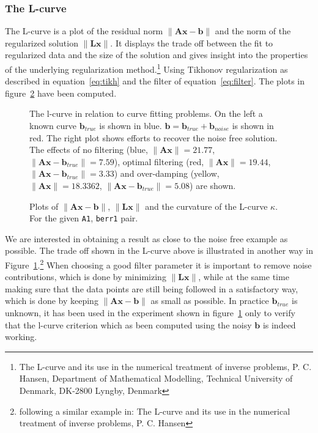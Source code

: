 \subsubsection{The L-curve}
The L-curve is a plot of the residual norm $\|\mathbf{Ax} - \mathbf{b}\|$ and the norm of the regularized solution $\|\mathbf{Lx}\|$. It displays the trade off between the fit to regularized data and the size of the solution and gives insight into the properties of the underlying regularization method.\footnote{The L-curve and its use in the numerical treatment of inverse problems, P. C. Hansen, Department of Mathematical Modelling, Technical University of Denmark, DK-2800 Lyngby, Denmark} Using Tikhonov regularization as described in equation~\ref{eq:tikh} and the filter of equation~\ref{eq:filter}. The plots in figure~\ref{fig:A1LTihk} have been computed. 
\begin{figure}
\centering

\caption{The l-curve in relation to curve fitting problems. On the left a known curve $\mathbf{b}_{true}$ is shown in blue. $\mathbf{b} = \mathbf{b}_{true} + \mathbf{b}_{noise}$ is shown in red. The right plot shows efforts to recover the noise free solution. The effects of no filtering (blue, $\|\mathbf{Ax}\| = 21.77$, $\|\mathbf{Ax}-\mathbf{b}_{true}\| =7.59$), optimal filtering (red, $\|\mathbf{Ax}\| = 19.44$, $\|\mathbf{Ax}-\mathbf{b}_{true}\| = 3.33$) and over-damping (yellow, $\|\mathbf{Ax}\| =  18.3362$, $\|\mathbf{Ax}-\mathbf{b}_{true}\| = 5.08$) are shown.} 
\label{fig:knownFitFilt}
\end{figure} 
\begin{figure}
\centering



\caption{Plots of $\|\mathbf{Ax} - \mathbf{b}\|$, $\|\mathbf{Lx}\|$ and the curvature of the L-curve $\kappa$. For the given \texttt{A1}, \texttt{berr1} pair.} 
\label{fig:A1LTihk}
\end{figure} 
We are interested in obtaining a result as close to the noise free example as possible. The trade off shown in the L-curve above is illustrated in another way in Figure~\ref{fig:knownFitFilt}.\footnote{following a similar example in: The L-curve and its use in the numerical treatment of inverse problems, P. C. Hansen} When choosing a good filter parameter it is important to remove noise contributions, which is done by minimizing $\|\mathbf{Lx}\|$, while at the same time making sure that the data points are still being followed in a satisfactory way, which is done by keeping $\|\mathbf{Ax} - \mathbf{b}\|$ as small as possible. In practice $\mathbf{b}_{true}$ is unknown, it has been used in the experiment shown in figure~\ref{fig:knownFitFilt} only to verify that the l-curve criterion which as been computed using the noisy $\mathbf{b}$ is indeed working. 
